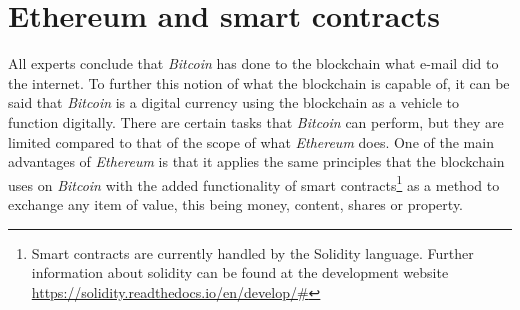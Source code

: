 \documentclass[submission,copyright,creativecommons]{eptcs}
\begin{document}
\section{Ethereum and smart contracts}
All experts conclude that \textit{Bitcoin} has done to the blockchain what e-mail did to the internet.  To further this notion of what the blockchain is capable of, it can be said that \textit{Bitcoin} is a digital currency using the blockchain as a vehicle to function digitally.  There are certain tasks that \textit{Bitcoin} can perform, but they are limited compared to that of the scope of what \textit{Ethereum} does.  One of the main advantages of \textit{Ethereum} is that it applies the same principles that the blockchain uses on \textit{Bitcoin} with the added functionality of smart contracts\footnote{Smart contracts are currently handled by the Solidity language.  Further information about solidity can be found at the development website \url{https://solidity.readthedocs.io/en/develop/#}\cite{SoliditySolidity23}} as a method to exchange any item of value, this being money, content, shares or property.
\end{document}
